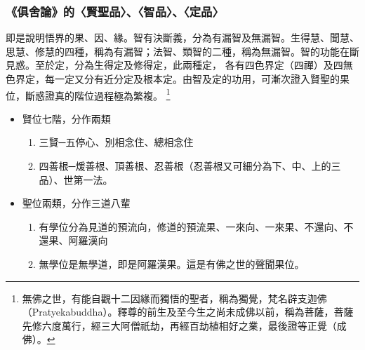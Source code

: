 \subsubsection{《俱舍論》的〈賢聖品〉、〈智品〉、〈定品〉}
即是說明悟界的果、因、緣。智有決斷義，分為有漏智及無漏智。生得慧、聞慧、思慧、修慧的四種，稱為有漏智；法智、類智的二種，稱為無漏智。智的功能在斷見惑。至於定，分為生得定及修得定，此兩種定，
各有四色界定（四禪）及四無色界定，每一定又分有近分定及根本定。由智及定的功用，可漸次證入賢聖的果位，斷惑證真的階位過程極為繁複。
\footnote{無佛之世，有能自觀十二因緣而獨悟的聖者，稱為獨覺，梵名辟支迦佛（Pratyekabuddha）。釋尊的前生及至今生之尚未成佛以前，稱為菩薩，菩薩先修六度萬行，經三大阿僧祇劫，再經百劫植相好之業，最後證等正覺（成佛）。}
\begin{itemize}
  \item
    賢位七階，分作兩類
    \begin{enumerate}
      \item 三賢─五停心、別相念住、總相念住
      \item 四善根─煖善根、頂善根、忍善根（忍善根又可細分為下、中、上的三品）、世第一法。
    \end{enumerate}
  \item
    聖位兩類，分作三道八輩
    \begin{enumerate}
      \item 有學位分為見道的預流向，修道的預流果、一來向、一來果、不還向、不還果、阿羅漢向
      \item 無學位是無學道，即是阿羅漢果。這是有佛之世的聲聞果位。
    \end{enumerate}
\end{itemize}
